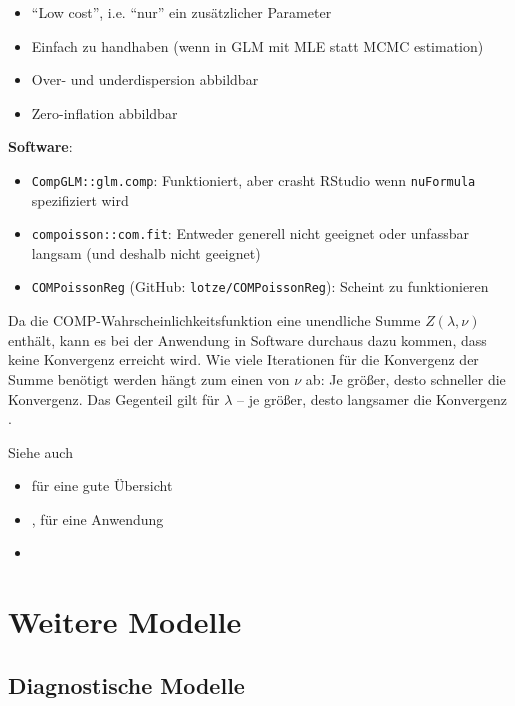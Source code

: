 \documentclass[ngerman,a4paper,]{scrartcl}
\providecommand{\tightlist}{%
  \setlength{\itemsep}{0pt}\setlength{\parskip}{0pt}}
\theoremstyle{definition}
\theoremstyle{definition}
\theoremstyle{definition}
\theoremstyle{remark}
\begin{document}
\begin{itemize}
\tightlist
\item
  \enquote{Low cost}, i.e. \enquote{nur} ein zusätzlicher Parameter
\item
  Einfach zu handhaben (wenn in GLM mit MLE statt MCMC estimation)
\item
  Over- und underdispersion abbildbar
\item
  Zero-inflation abbildbar
\end{itemize}

\textbf{Software}:

\begin{itemize}
\tightlist
\item
  \texttt{CompGLM::glm.comp}: Funktioniert, aber crasht RStudio wenn \texttt{nuFormula} spezifiziert wird
\item
  \texttt{compoisson::com.fit}: Entweder generell nicht geeignet oder unfassbar langsam (und deshalb nicht geeignet)
\item
  \texttt{COMPoissonReg} (GitHub: \texttt{lotze/COMPoissonReg}): Scheint zu funktionieren
\end{itemize}

Da die COMP-Wahrscheinlichkeitsfunktion eine unendliche Summe \(Z(\lambda, \nu)\) enthält, kann es bei der Anwendung in Software durchaus dazu kommen, dass keine Konvergenz erreicht wird. Wie viele Iterationen für die Konvergenz der Summe benötigt werden hängt zum einen von \(\nu\) ab: Je größer, desto schneller die Konvergenz. Das Gegenteil gilt für \(\lambda\) -- je größer, desto langsamer die Konvergenz \citep[p.~4]{high2018AlternativeVariance}.

Siehe auch

\begin{itemize}
\tightlist
\item
  \citet{sellers2010FlexibleRegression} für eine gute Übersicht
\item
  \citet{lord2010ExtensionApplication}, \citet{lord2008ApplicationConwayMaxwellPoisson} für eine Anwendung
\item
  \citet{shmueli2005UsefulDistribution}
\end{itemize}

\hypertarget{weitere-modelle}{%
\section{Weitere Modelle}\label{weitere-modelle}}

\hypertarget{diagnostische-modelle}{%
\subsection{Diagnostische Modelle}\label{diagnostische-modelle}}
\end{document}
